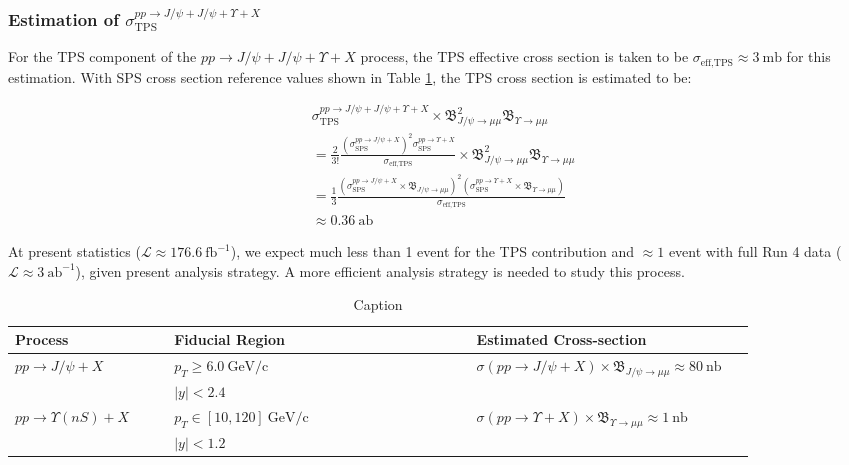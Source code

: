 \documentclass[10pt,twocolumn]{article}
\newcommand*{\effXsecTPS}{\sigma_{\text{eff,TPS}}}
\newcommand*{\GeVc}{~\text{GeV/c}}
\begin{document}
\subsubsection{Estimation of $\sigma_{\text{TPS}}^{pp\to J/\psi+J/\psi+\Upsilon+X}$}

For the TPS component of the $pp\to J/\psi+J/\psi+\Upsilon+X$ process, the TPS effective cross section is taken to be $\effXsecTPS \approx 3 ~\text{mb}$ for this estimation. With SPS cross section reference values shown in Table \ref{tab:sps_xsec}, the TPS cross section is estimated to be:

\begin{equation}
    \begin{aligned}
    & \sigma_{\text{TPS}}^{pp\to J/\psi+J/\psi+\Upsilon+X} \times \mathfrak{B}_{J/\psi\to\mu\mu}^2\mathfrak{B}_{\Upsilon\to\mu\mu} \\
    & = \frac{2}{3!} \frac{\left(\sigma^{pp\to J/\psi+X}_{\text{SPS}}\right)^2\sigma^{pp\to \Upsilon+X}_{\text{SPS}}}{\effXsecTPS}\times \mathfrak{B}_{J/\psi\to\mu\mu}^2\mathfrak{B}_{\Upsilon\to\mu\mu} \\
    & = \frac{1}{3} \frac{\left(\sigma^{pp\to J/\psi+X}_{\text{SPS}}\times \mathfrak{B}_{J/\psi\to\mu\mu}\right)^2\left(\sigma^{pp\to \Upsilon+X}_{\text{SPS}}\times\mathfrak{B}_{\Upsilon\to\mu\mu}\right)}{\effXsecTPS} \\
    & \approx 0.36 ~\text{ab}
    \end{aligned} 
\end{equation}

At present statistics ($\mathcal{L} \approx 176.6 ~\text{fb}^{-1}$), we expect much less than 1 event for the TPS contribution and $\approx 1$ event with full Run 4 data ($\mathcal{L} \approx 3 ~\text{ab}^{-1}$), given present analysis strategy. A more efficient analysis strategy is needed to study this process.

\begin{table}[h!]
    \centering
    \caption{Caption}
    \begin{tabular}{p{0.2\linewidth} p{0.38\linewidth} p{0.35\linewidth}}
    \toprule
        Process & Fiducial Region & Estimated Cross-section \\
    \midrule
        \multirow{2}{\linewidth}{$pp\to J/\psi+X$}&
        $p_T\geq 6.0 \GeVc$ &
        \multirow{2}{\linewidth}{$\sigma(pp\to J/\psi+X) \times \mathfrak{B}_{J/\psi\to\mu\mu} \approx 80 ~\text{nb}$} \\
        & $|y| < 2.4$& \\
        \multirow{2}{\linewidth}{$pp\to \Upsilon(nS) +X$}&
        $p_T\in [10,120] \GeVc$ &
        \multirow{2}{\linewidth}{$\sigma(pp\to \Upsilon+X) \times \mathfrak{B}_{\Upsilon\to\mu\mu} \approx 1~\text{nb}$} \\
        & $|y| < 1.2$& \\
    \bottomrule
    \end{tabular}
    \label{tab:sps_xsec}
\end{table}
\end{document}
